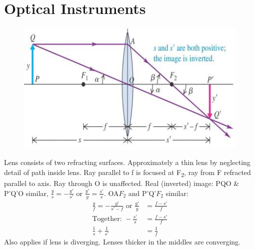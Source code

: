 \documentclass[a4paper, 11pt, normalem]{report}
\begin{document}
\section{Optical Instruments}
\begin{figure}[H]
    \centering
    \includegraphics[scale=0.8]{Optic.jpg}
\end{figure}
Lens consists of two refracting surfaces.
Approximately a thin lens by neglecting detail of path inside lens.
Ray parallel to f is focused at F\textsubscript{2}, ray from F refracted parallel to axis.
Ray through O is unaffected.
Real (inverted) image: PQO \& P'Q'O similar, $\frac{y}{s} = -\frac{y'}{s'}$ or $\frac{y'}{y} = \frac{s'}{s}$.
OA$F_{2}$ and P'Q'$F_{2}$ similar:
\begin{align}
    \frac{y}{f} = -\frac{y'}{s' - f}\text{ or }\frac{y'}{y} &= \frac{f - s'}{f} \\
    \text{Together: }-\frac{s'}{s} &= \frac{f - s'}{f} \\
    \frac{1}{s} + \frac{1}{s'} &= \frac{1}{f}
\end{align}
Also applies if lens is diverging.
Lenses thicker in the middles are converging.
\end{document}
